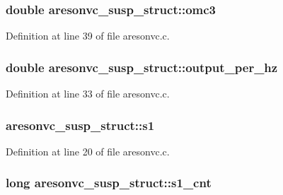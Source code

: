 \subsubsection[{\texorpdfstring{omc3}{omc3}}]{\setlength{\rightskip}{0pt plus 5cm}double aresonvc\+\_\+susp\+\_\+struct\+::omc3}\hypertarget{structaresonvc__susp__struct_af1a71e626a745e5b3812a802635378b4}{}\label{structaresonvc__susp__struct_af1a71e626a745e5b3812a802635378b4}


Definition at line 39 of file aresonvc.\+c.

\subsubsection[{\texorpdfstring{output\+\_\+per\+\_\+hz}{output_per_hz}}]{\setlength{\rightskip}{0pt plus 5cm}double aresonvc\+\_\+susp\+\_\+struct\+::output\+\_\+per\+\_\+hz}\hypertarget{structaresonvc__susp__struct_af08f1a92af933a540a711bd34a82cd5f}{}\label{structaresonvc__susp__struct_af08f1a92af933a540a711bd34a82cd5f}


Definition at line 33 of file aresonvc.\+c.

\subsubsection[{\texorpdfstring{s1}{s1}}]{ aresonvc\+\_\+susp\+\_\+struct\+::s1}\hypertarget{structaresonvc__susp__struct_adec9cc289bfdce7e8efe2b78f1411906}{}\label{structaresonvc__susp__struct_adec9cc289bfdce7e8efe2b78f1411906}


Definition at line 20 of file aresonvc.\+c.

\subsubsection[{\texorpdfstring{s1\+\_\+cnt}{s1_cnt}}]{\setlength{\rightskip}{0pt plus 5cm}long aresonvc\+\_\+susp\+\_\+struct\+::s1\+\_\+cnt}\hypertarget{structaresonvc__susp__struct_abf0592198bd024df41540d9b1adb6fcb}{}\label{structaresonvc__susp__struct_abf0592198bd024df41540d9b1adb6fcb}


